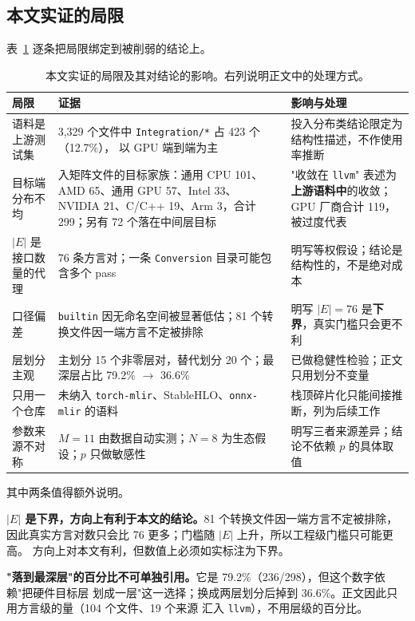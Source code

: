 \subsection{本文实证的局限}

表~\ref{tab:threats} 逐条把局限绑定到被削弱的结论上。

\begin{table}[t]
  \caption{本文实证的局限及其对结论的影响。右列说明正文中的处理方式。}
  \label{tab:threats}
  \small
  \begin{tabularx}{\linewidth}{@{}l X X@{}}
    \toprule
    局限 & 证据 & 影响与处理 \\
    \midrule
    语料是上游测试集 & 3,329 个文件中 \texttt{Integration/*} 占 423 个（12.7\%），
      以 GPU 端到端为主 & 投入分布类结论限定为结构性描述，不作使用率推断 \\
    目标端分布不均 & 入矩阵文件的目标家族：通用 CPU 101、AMD 65、通用 GPU 57、Intel 33、
      NVIDIA 21、C/C++ 19、Arm 3，合计 299；另有 72 个落在中间层目标
      & "收敛在 \texttt{llvm}" 表述为\textbf{上游语料中}的收敛；GPU 厂商合计 119，被过度代表 \\
    $|E|$ 是接口数量的代理 & 76 条方言对；一条 \texttt{Conversion} 目录可能包含多个 pass
      & 明写等权假设；结论是结构性的，不是绝对成本 \\
    口径偏差 & \texttt{builtin} 因无命名空间被显著低估；81 个转换文件因一端方言不定被排除
      & 明写 $|E|=76$ 是\textbf{下界}，真实门槛只会更不利 \\
    层划分主观 & 主划分 15 个非零层对，替代划分 20 个；最深层占比 79.2\% $\rightarrow$ 36.6\%
      & 已做稳健性检验；正文只用划分不变量 \\
    只用一个仓库 & 未纳入 \texttt{torch-mlir}、StableHLO、\texttt{onnx-mlir} 的语料
      & 栈顶碎片化只能间接推断，列为后续工作 \\
    参数来源不对称 & $M=11$ 由数据自动实测；$N=8$ 为生态假设；$p$ 只做敏感性
      & 明写三者来源差异；结论不依赖 $p$ 的具体取值 \\
    \bottomrule
  \end{tabularx}
\end{table}

其中两条值得额外说明。

\textbf{$|E|$ 是下界，方向上有利于本文的结论。}81 个转换文件因一端方言不定被排除，
因此真实方言对数只会比 76 更多；门槛随 $|E|$ 上升，所以工程级门槛只可能更高。
方向上对本文有利，但数值上必须如实标注为下界。

\textbf{"落到最深层"的百分比不可单独引用。}它是 79.2\%（236/298），但这个数字依赖"把硬件目标层
划成一层"这一选择；换成两层划分后掉到 36.6\%。正文因此只用方言级的量（104 个文件、19 个来源
汇入 \texttt{llvm}），不用层级的百分比。


